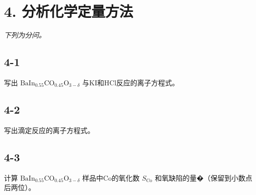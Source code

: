 \section*{4. 分析化学定量方法}
\textit{下列为分问。}

\subsection*{4-1}
写出 $\mathrm { B a I n } _ { 0 . 5 5 } \mathrm { C O } _ { 0 . 4 5 } \mathrm { O } _ { 3 - \delta }$ 与KI和HCl反应的离⼦⽅程式。

\subsection*{4-2}
写出滴定反应的离⼦⽅程式。

\subsection*{4-3}
计算 $\mathrm { B a I n } _ { 0 . 5 5 } \mathrm { C O } _ { 0 . 4 5 } \mathrm { O } _ { 3 - \delta }$ 样品中Co的氧化数 $S _ { \mathrm { C o } }$ 和氧缺陷的量�（保留到⼩数点后两位）。
